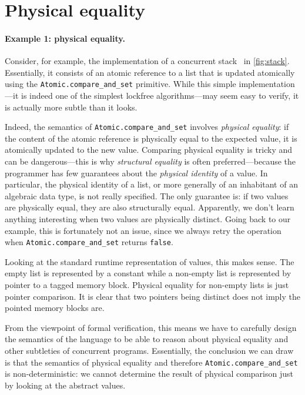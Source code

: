 \section{Physical equality}
\label{sec:physical_equality}




\paragraph{Example 1: physical equality.}

Consider, for example, the \OCaml implementation of a concurrent stack~\cite{thomas1986systems} in \cref{fig:stack}.
Essentially, it consists of an atomic reference to a list that is updated atomically using the \texttt{Atomic.compare_and_set} primitive.
While this simple implementation---it is indeed one of the simplest lockfree algorithms---may seem easy to verify, it is actually more subtle than it looks.

Indeed, the semantics of \texttt{Atomic.compare_and_set} involves \emph{physical equality}: if the content of the atomic reference is physically equal to the expected value, it is atomically updated to the new value.
Comparing physical equality is tricky and can be dangerous---this is why \emph{structural equality} is often preferred---because the programmer has few guarantees about the \emph{physical identity} of a value.
In particular, the physical identity of a list, or more generally of an inhabitant of an algebraic data type, is not really specified.
The only guarantee is: if two values are physically equal, they are also structurally equal.
Apparently, we don't learn anything interesting when two values are physically distinct.
Going back to our example, this is fortunately not an issue, since we always retry the operation when \texttt{Atomic.compare_and_set} returns \texttt{false}.

Looking at the standard runtime representation of \OCaml values, this makes sense.
The empty list is represented by a constant while a non-empty list is represented by pointer to a tagged memory block.
Physical equality for non-empty lists is just pointer comparison.
It is clear that two pointers being distinct does not imply the pointed memory blocks are.

From the viewpoint of formal verification, this means we have to carefully design the semantics of the language to be able to reason about physical equality and other subtleties of concurrent programs.
Essentially, the conclusion we can draw is that the semantics of physical equality and therefore \texttt{Atomic.compare_and_set} is non-deterministic: we cannot determine the result of physical comparison just by looking at the abstract values.

